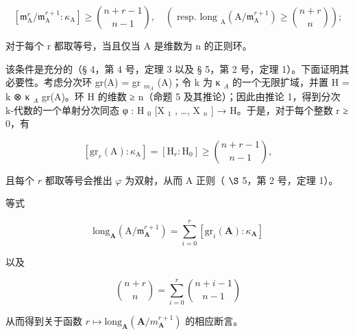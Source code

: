 \[
\left[ \mathfrak {m} _ {\mathrm{A}} ^ {r} / \mathfrak {m} _ {\mathrm{A}} ^ {r + 1}: \kappa_ {\mathrm{A}} \right] \geqslant \binom {n + r - 1} {n - 1}, \quad \left(\text { resp.   long } _ {\mathrm{A}} (\mathrm{A} / \mathfrak {m} _ {\mathrm{A}} ^ {r + 1}) \geqslant \binom {n + r} {n}\right);
\]

对于每个 r 都取等号，当且仅当 A 是维数为 n 的正则环。

该条件是充分的（§ 4，第 4 号，定理 3 以及 § 5，第 2 号，定理 1）。下面证明其必要性。考虑分次环 gr(A) = gr \(_{m_A}\) (A)；令 k 为 κ \(_A\) 的一个无限扩域，并置 H = k ⊗ κ \(_A\) gr(A)。环 H 的维数 ≥ n（命题 5 及其推论）；因此由推论 1，得到分次 k-代数的一个单射分次同态 φ : H \(_0\) {[}X \(_1\) , \ldots, X \(_n\) {]} → H。于是，对于每个整数 r ≥ 0，有

\[
\left[ \mathrm{gr} _ {r} (\mathrm{A}): \kappa_ {\mathrm{A}} \right] = \left[ \mathrm{H} _ {r}: \mathrm{H} _ {0} \right] \geqslant \binom {n + r - 1} {n - 1},
\]

且每个 \(r\) 都取等号会推出 \(\varphi\) 为双射，从而 A 正则（ \(\S\) 5，第 2 号，定理 1）。

等式

\[
\mathrm{long} _ {\mathbf {A}} (\mathrm{A} / \mathfrak {m} _ {\mathbf {A}} ^ {r + 1}) = \sum_ {i = 0} ^ {r} \left[ \mathrm{gr} _ {i} (\mathbf {A}): \kappa_ {\mathbf {A}} \right]
\]

以及

\[
\binom {n + r} {n} = \sum_ {i = 0} ^ {r} \binom {n + i - 1} {n - 1}
\]

从而得到关于函数 \(r \mapsto \text{long}_{\mathbf{A}}(\mathbf{A}/m_{\mathbf{A}}^{r+1})\) 的相应断言。


